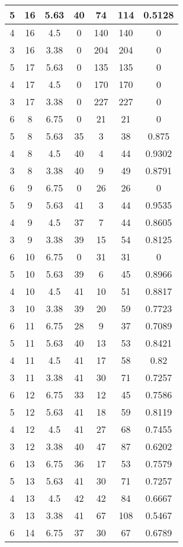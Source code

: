 \documentclass[letterpaper, 12pt]{article}
\begin{document}
\begin{longtable}{|c|c|c|c|c|c|c|}
\hline
5 & 16 & 5.63 & 40 & 74 & 114 & 0.5128 \\
\hline
4 & 16 & 4.5 & 0 & 140 & 140 & 0 \\
\hline
3 & 16 & 3.38 & 0 & 204 & 204 & 0 \\
\hline
5 & 17 & 5.63 & 0 & 135 & 135 & 0 \\
\hline
4 & 17 & 4.5 & 0 & 170 & 170 & 0 \\
\hline
3 & 17 & 3.38 & 0 & 227 & 227 & 0 \\
\hline
6 & 8 & 6.75 & 0 & 21 & 21 & 0 \\
\hline
5 & 8 & 5.63 & 35 & 3 & 38 & 0.875 \\
\hline
4 & 8 & 4.5 & 40 & 4 & 44 & 0.9302 \\
\hline
3 & 8 & 3.38 & 40 & 9 & 49 & 0.8791 \\
\hline
6 & 9 & 6.75 & 0 & 26 & 26 & 0 \\
\hline
5 & 9 & 5.63 & 41 & 3 & 44 & 0.9535 \\
\hline
4 & 9 & 4.5 & 37 & 7 & 44 & 0.8605 \\
\hline
3 & 9 & 3.38 & 39 & 15 & 54 & 0.8125 \\
\hline
6 & 10 & 6.75 & 0 & 31 & 31 & 0 \\
\hline
5 & 10 & 5.63 & 39 & 6 & 45 & 0.8966 \\
\hline
4 & 10 & 4.5 & 41 & 10 & 51 & 0.8817 \\
\hline
3 & 10 & 3.38 & 39 & 20 & 59 & 0.7723 \\
\hline
6 & 11 & 6.75 & 28 & 9 & 37 & 0.7089 \\
\hline
5 & 11 & 5.63 & 40 & 13 & 53 & 0.8421 \\
\hline
4 & 11 & 4.5 & 41 & 17 & 58 & 0.82 \\
\hline
3 & 11 & 3.38 & 41 & 30 & 71 & 0.7257 \\
\hline
6 & 12 & 6.75 & 33 & 12 & 45 & 0.7586 \\
\hline
5 & 12 & 5.63 & 41 & 18 & 59 & 0.8119 \\
\hline
4 & 12 & 4.5 & 41 & 27 & 68 & 0.7455 \\
\hline
3 & 12 & 3.38 & 40 & 47 & 87 & 0.6202 \\
\hline
6 & 13 & 6.75 & 36 & 17 & 53 & 0.7579 \\
\hline
5 & 13 & 5.63 & 41 & 30 & 71 & 0.7257 \\
\hline
4 & 13 & 4.5 & 42 & 42 & 84 & 0.6667 \\
\hline
3 & 13 & 3.38 & 41 & 67 & 108 & 0.5467 \\
\hline
6 & 14 & 6.75 & 37 & 30 & 67 & 0.6789 \\

\end{longtable}
\end{document}
